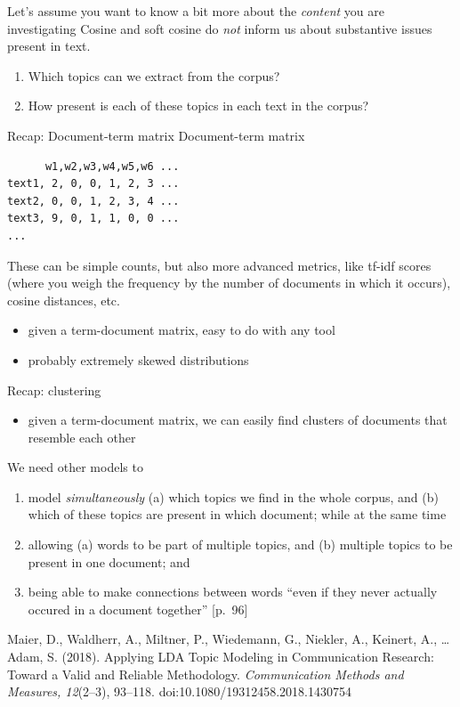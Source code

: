 \documentclass[compress]{beamer}
\begin{document}
\begin{frame}{Let's assume you want to know a bit more about the \emph{content} you are investigating}
Cosine and soft cosine do \emph{not} inform us about substantive issues present in text. 
	\begin{enumerate}
		\item Which topics can we extract from the corpus?
		\item How present is each of these topics in each text in the corpus?
	\end{enumerate}
\end{frame}

\begin{frame}[fragile]{Recap: Document-term matrix}
	Document-term matrix
	\begin{lstlisting}
      w1,w2,w3,w4,w5,w6 ...
text1, 2, 0, 0, 1, 2, 3 ...
text2, 0, 0, 1, 2, 3, 4 ...
text3, 9, 0, 1, 1, 0, 0 ...
...
	\end{lstlisting}
	{\small{These can be simple counts, but also more advanced metrics, like tf-idf scores (where you weigh the frequency by the number of documents in which it occurs), cosine distances, etc.}}
	\pause
	\begin{itemize}
		\item given a term-document matrix, easy to do with any tool
		\item probably extremely skewed distributions
	\end{itemize}
	
\end{frame}


\begin{frame}{Recap: clustering}
	\begin{itemize}
		\item given a term-document matrix, we can easily find clusters of documents that resemble each other
	\end{itemize}
\end{frame}


\begin{frame}{We need other models to}
	\begin{enumerate}[<+->]
		\item model \emph{simultaneously} (a) which topics we find in the whole corpus, and (b) which of these topics are present in which document; while at the same time
		\item allowing (a) words to be part of multiple topics, and (b) multiple topics to be present in one document; and
		\item being able to make connections between words ``even if they never actually occured in a document together'' \parencite{Maier2018}[p.~96]
	\end{enumerate}
	
	\tiny{Maier, D., Waldherr, A., Miltner, P., Wiedemann, G., Niekler, A., Keinert, A., \ldots Adam, S. (2018). Applying LDA Topic Modeling in Communication Research: Toward a Valid and Reliable Methodology. \textit{Communication Methods and Measures, 12}(2--3), 93--118. doi:10.1080/19312458.2018.1430754}
\end{frame}
\end{document}

